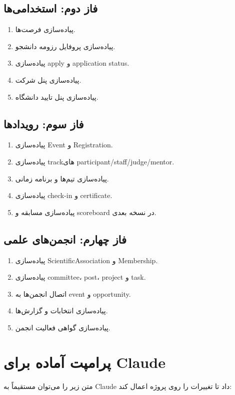 \documentclass[12pt,a4paper]{article}
\begin{document}
\subsection{فاز دوم: استخدامی‌ها}
\begin{enumerate}
\item پیاده‌سازی فرصت‌ها.
\item پیاده‌سازی پروفایل رزومه دانشجو.
\item پیاده‌سازی apply و application status.
\item پیاده‌سازی پنل شرکت.
\item پیاده‌سازی پنل تایید دانشگاه.
\end{enumerate}

\subsection{فاز سوم: رویدادها}
\begin{enumerate}
\item پیاده‌سازی Event و Registration.
\item پیاده‌سازی trackهای participant/staff/judge/mentor.
\item پیاده‌سازی تیم‌ها و برنامه زمانی.
\item پیاده‌سازی check-in و certificate.
\item پیاده‌سازی مسابقه و scoreboard در نسخه بعدی.
\end{enumerate}

\subsection{فاز چهارم: انجمن‌های علمی}
\begin{enumerate}
\item پیاده‌سازی ScientificAssociation و Membership.
\item پیاده‌سازی committee، post، project و task.
\item اتصال انجمن‌ها به event و opportunity.
\item پیاده‌سازی انتخابات و گزارش‌ها.
\item پیاده‌سازی گواهی فعالیت انجمن.
\end{enumerate}

\section{پرامپت آماده برای Claude}
متن زیر را می‌توان مستقیماً به Claude داد تا تغییرات را روی پروژه اعمال کند:
\end{document}
